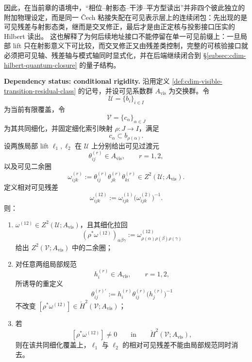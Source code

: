\noindent
因此，在当前章的语境中，“相位--射影态--干涉--平方型读出”并非四个彼此独立的附加物理设定，而是同一 \v{C}ech 粘接失配在可见表示层上的连续闭包：先出现的是可见残差与射影态类，继而是交叉修正，最后才是由正定核与投影接口压实的 Hilbert 读出。
\noindent
这也解释了为何后续地址接口不能停留在单一可见前缀上：一旦局部 lift 只在射影意义下可比较，而交叉修正又由残差类控制，完整的可核验接口就必须把可见轴、残差轴与模式轴同时显式化，并在后端继续闭合到 \S\ref{subsec:cdim-hilbert-quantum-closure} 的量子结构。

\begin{proposition}[可见残差的共同细化不变性]\label{prop:distill-cech-cohomology-visible-residual-common-refinement-invariance}
\textbf{Dependency status: conditional rigidity.}
沿用定义 \ref{def:cdim-visible-transition-residual-class} 的记号，并设可见系数群 \(A_{\mathrm{vis}}\) 为交换群。令
\[
\mathcal U=\{b_i\}_{i\in I}
\]
为当前有限覆盖，令
\[
\mathcal V=\{c_\alpha\}_{\alpha\in J}
\]
为其共同细化，并固定细化索引映射 \(\rho:J\to I\)，满足
\[
c_\alpha\subset b_{\rho(\alpha)}.
\]
设两族局部 lift \(\ell_1,\ell_2\) 在 \(\mathcal U\) 上分别给出可见过渡元
\[
\theta^{(r)}_{ij}\in A_{\mathrm{vis}},\qquad r=1,2,
\]
以及可见二余圈
\[
\omega^{(r)}_{ijk}:=\theta^{(r)}_{ij}\theta^{(r)}_{jk}\theta^{(r)}_{ki}\in Z^2(\mathcal U;A_{\mathrm{vis}}).
\]
定义相对可见残差
\[
\omega^{(12)}_{ijk}:=\omega^{(1)}_{ijk}\bigl(\omega^{(2)}_{ijk}\bigr)^{-1}.
\]
则：
\begin{enumerate}
  \item \(\omega^{(12)}\in Z^2(\mathcal U;A_{\mathrm{vis}})\)，且其细化拉回
  \[
  (\rho^\ast\omega^{(12)})_{\alpha\beta\gamma}
  :=\omega^{(12)}_{\rho(\alpha)\rho(\beta)\rho(\gamma)}
  \]
  给出 \(Z^2(\mathcal V;A_{\mathrm{vis}})\) 中的二余圈；
  \item 对任意两组局部规范
  \[
  h_i^{(r)}\in A_{\mathrm{vis}},\qquad r=1,2,
  \]
  所诱导的重定义
  \[
  \theta^{(r)\prime}_{ij}:=h_i^{(r)}\theta^{(r)}_{ij}\bigl(h_j^{(r)}\bigr)^{-1}
  \]
  不改变 \([\rho^\ast\omega^{(12)}]\in \check H^2(\mathcal V;A_{\mathrm{vis}})\)；
  \item 若
  \[
  [\rho^\ast\omega^{(12)}]\ne 0
  \qquad\text{in}\qquad
  \check H^2(\mathcal V;A_{\mathrm{vis}}),
  \]
  则在该共同细化覆盖上，\(\ell_1\) 与 \(\ell_2\) 的相对可见残差不能由局部规范同时消去。
\end{enumerate}
\end{proposition}
